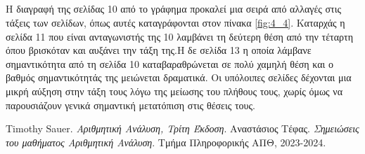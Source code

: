 \documentclass[a4paper,11pt]{article}
\newcommand{\lt}{\latintext}
\newcommand{\gt}{\greektext}
\begin{document}
\subsection{} %

Η διαγραφή της σελίδας 10 από το γράφημα προκαλεί μια σειρά από αλλαγές στις τάξεις των σελίδων, όπως αυτές καταγράφονται στον πίνακα \ref{fig:4_4}. Καταρχάς η σελίδα 11 που είναι ανταγωνιστής της 10 λαμβάνει τη δεύτερη θέση από την τέταρτη όπου βρισκόταν και αυξάνει την τάξη της.Η δε σελίδα 13 η οποία λάμβανε σημαντικότητα από τη σελίδα 10 καταβαραθρώνεται σε πολύ χαμηλή θέση και ο βαθμός σημαντικότητάς της μειώνεται δραματικά. Οι υπόλοιπες σελίδες δέχονται μια μικρή αύξηση στην τάξη τους λόγω της μείωσης του πλήθους τους, χωρίς όμως να παρουσιάζουν γενικά σημαντική μετατόπιση στις θέσεις τους.  

\begin{table}[h]
    \centering
    \caption{Σύγκριση των τάξεων των σελίδων (6)}
    \label{fig:4_4}
\end{table}

\begin{thebibliography}{2}

\lt
{}Timothy Sauer. \gt \emph{Αριθμητική Ανάλυση, Τρίτη Έκδοση}. 
Αναστάσιος Τέφας. \emph{Σημειώσεις του μαθήματος Αριθμητική Ανάλυση}. Τμήμα Πληροφορικής ΑΠΘ, 2023-2024.
    
\end{thebibliography}
\end{document}
